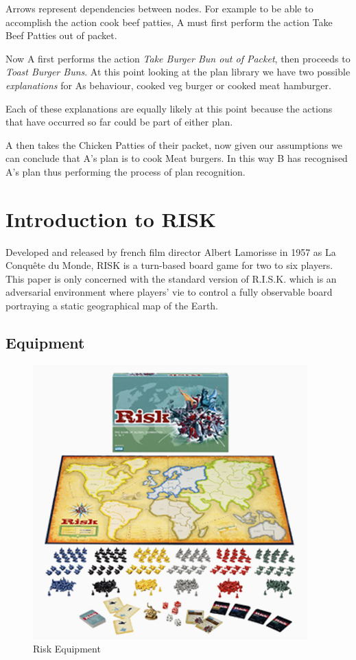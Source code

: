 \documentclass[parskip]{cs4rep}
\begin{document}
Arrows represent dependencies between nodes. For example to be able to accomplish the action cook beef patties, A must first perform the action Take Beef Patties out of packet.

Now A first performs the action \textit{Take Burger Bun out of Packet}, then proceeds to \textit{Toast Burger Buns}. At this point looking at the plan library we have two possible \textit{explanations} for As behaviour, cooked veg burger or cooked meat hamburger.

Each of these explanations are equally likely at this point because the actions that have occurred so far could be part of either plan.

A then takes the Chicken Patties of their packet, now given our assumptions we can conclude that A's plan is to cook Meat burgers. In this way B has recognised A's plan thus performing the process of plan recognition.

\newpage

\section{Introduction to RISK}

Developed and released by french film director Albert Lamorisse in 1957 as La Conqu\^ete du Monde, RISK is a turn-based board game for two to six players. This paper is only concerned with the standard version of R.I.S.K. which is an adversarial environment where players' vie to control a fully observable board portraying a static geographical map of the Earth.

\subsection{Equipment}

\begin{figure}[h]
\centering
\includegraphics{images/risk-board}
\caption{Risk Equipment}
\label{fig:risk-equipment}
\end{figure}
\end{document}

